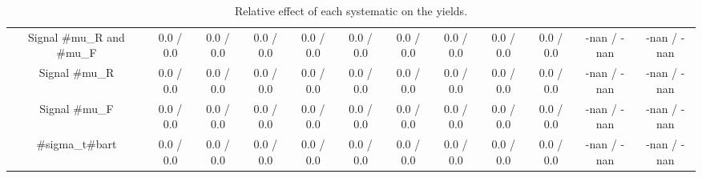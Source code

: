 \begin{table}[htbp]
\begin{center}
\begin{tabular}{|c|c|c|c|c|c|c|c|c|c|c|c|}
  Signal #mu_{R} and #mu_{F} & 0.0 / 0.0 & 0.0 / 0.0 & 0.0 / 0.0 & 0.0 / 0.0 & 0.0 / 0.0 & 0.0 / 0.0 & 0.0 / 0.0 & 0.0 / 0.0 & 0.0 / 0.0 & -nan / -nan & -nan / -nan \\ 
  Signal #mu_{R} & 0.0 / 0.0 & 0.0 / 0.0 & 0.0 / 0.0 & 0.0 / 0.0 & 0.0 / 0.0 & 0.0 / 0.0 & 0.0 / 0.0 & 0.0 / 0.0 & 0.0 / 0.0 & -nan / -nan & -nan / -nan \\ 
  Signal #mu_{F} & 0.0 / 0.0 & 0.0 / 0.0 & 0.0 / 0.0 & 0.0 / 0.0 & 0.0 / 0.0 & 0.0 / 0.0 & 0.0 / 0.0 & 0.0 / 0.0 & 0.0 / 0.0 & -nan / -nan & -nan / -nan \\ 
  #sigma_{t#bar{t}} & 0.0 / 0.0 & 0.0 / 0.0 & 0.0 / 0.0 & 0.0 / 0.0 & 0.0 / 0.0 & 0.0 / 0.0 & 0.0 / 0.0 & 0.0 / 0.0 & 0.0 / 0.0 & -nan / -nan & -nan / -nan \\ 
\hline 
\end{tabular} 
\caption{Relative effect of each systematic on the yields.} 
\end{center} 
\end{table} 
